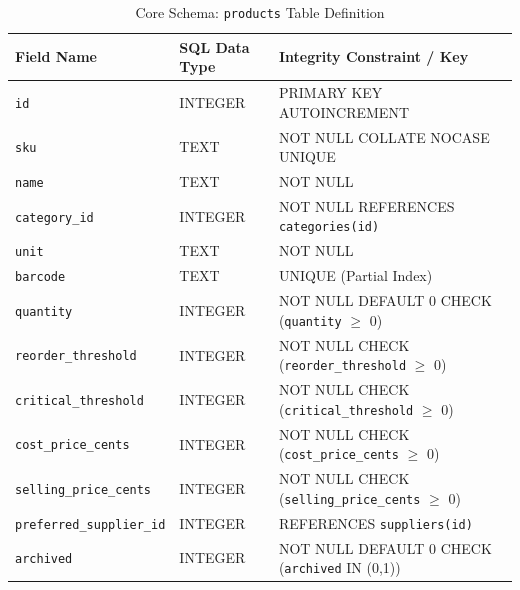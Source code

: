 \documentclass[BTech]{srmuthesis}
\begin{document}
\begin{table}[htpb]
\centering
\caption{Core Schema: \texttt{products} Table Definition}
\begin{tabular}{|l|l|l|}
\hline
\textbf{Field Name} & \textbf{SQL Data Type} & \textbf{Integrity Constraint / Key} \\ \hline
\texttt{id} & INTEGER & PRIMARY KEY AUTOINCREMENT \\ \hline
\texttt{sku} & TEXT & NOT NULL COLLATE NOCASE UNIQUE \\ \hline
\texttt{name} & TEXT & NOT NULL \\ \hline
\texttt{category\_id} & INTEGER & NOT NULL REFERENCES \texttt{categories(id)} \\ \hline
\texttt{unit} & TEXT & NOT NULL \\ \hline
\texttt{barcode} & TEXT & UNIQUE (Partial Index) \\ \hline
\texttt{quantity} & INTEGER & NOT NULL DEFAULT 0 CHECK (\texttt{quantity} $\ge$ 0) \\ \hline
\texttt{reorder\_threshold} & INTEGER & NOT NULL CHECK (\texttt{reorder\_threshold} $\ge$ 0) \\ \hline
\texttt{critical\_threshold}& INTEGER & NOT NULL CHECK (\texttt{critical\_threshold} $\ge$ 0) \\ \hline
\texttt{cost\_price\_cents} & INTEGER & NOT NULL CHECK (\texttt{cost\_price\_cents} $\ge$ 0) \\ \hline
\texttt{selling\_price\_cents}& INTEGER & NOT NULL CHECK (\texttt{selling\_price\_cents} $\ge$ 0) \\ \hline
\texttt{preferred\_supplier\_id}& INTEGER & REFERENCES \texttt{suppliers(id)} \\ \hline
\texttt{archived} & INTEGER & NOT NULL DEFAULT 0 CHECK (\texttt{archived} IN (0,1)) \\ \hline
\end{tabular}
\label{tab:prod_schema}
\end{table}
\end{document}

